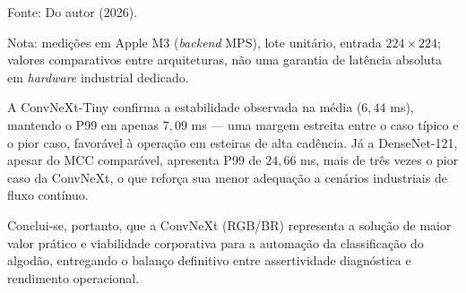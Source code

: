 \begin{table}[!h]
    \centering
    \begin{threeparttable}
    \caption{Distribuição de Latência de Inferência por Patch (RGB/BR, $N=1.582$).}
    \label{tab:latency_distribution}
    
    \begin{tablenotes}
            \small
            \item[] Fonte: Do autor (2026).
            \item[] Nota: medições em Apple M3 (\textit{backend} MPS), lote unitário, entrada $224 \times 224$; valores comparativos entre arquiteturas, não uma garantia de latência absoluta em \textit{hardware} industrial dedicado.
        \end{tablenotes}
        \end{threeparttable}
\end{table}

A ConvNeXt-Tiny confirma a estabilidade observada na média ($6,44$ ms), mantendo o P99 em apenas $7,09$ ms --- uma margem estreita entre o caso típico e o pior caso, favorável à operação em esteiras de alta cadência. Já a DenseNet-121, apesar do MCC comparável, apresenta P99 de $24,66$ ms, mais de três vezes o pior caso da ConvNeXt, o que reforça sua menor adequação a cenários industriais de fluxo contínuo.

Conclui-se, portanto, que a ConvNeXt (RGB/BR) representa a solução de maior valor prático e viabilidade corporativa para a automação da classificação do algodão, entregando o balanço definitivo entre assertividade diagnóstica e rendimento operacional.
